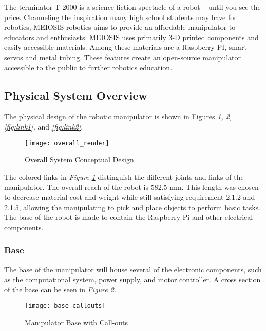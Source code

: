 The terminator T-2000 is a science-fiction spectacle of a robot -- until you see the price. Channeling the inspiration many high school students may have for robotics, MEIOSIS robotics aims to provide an affordable manipulator to educators and enthusiasts. MEIOSIS uses primarily 3-D printed components and easily accessible materials. Among these materials are a Raspberry PI, smart servos and metal tubing. These features create an open-source manipulator accessible to the public to further robotics education.
\subsection{Physical System Overview}
The physical design of the robotic manipulator is shown in Figures \emph{\ref{fig:overall}, \ref{fig:base}, \ref{fig:link1},} and \emph{\ref{fig:link2}}.

\begin{figure}[htp]
  \centering
  \texttt{[image: overall\_render]}
  \caption{Overall System Conceptual Design }
  \label{fig:overall}
\end{figure}

The colored links in \emph{Figure \ref{fig:overall}} distinguish the different joints and links of the manipulator. The overall reach of the robot is 582.5 mm. This length was chosen to decrease material cost and weight while still satisfying requirement 2.1.2 and 2.1.5, allowing the manipulating to pick and place objects to perform basic tasks. The base of the robot is made to contain the Raspberry Pi and other electrical components.

\subsubsection{Base}
The base of the manipulator will house several of the electronic components, such as the computational system, power supply, and motor controller. A cross section of the base can be seen in \emph{Figure \ref{fig:base}}.
\begin{figure}[htp]
  \centering
  \texttt{[image: base\_callouts]}
  \caption{Manipulator Base with Call-outs}
  \label{fig:base}
\end{figure}

